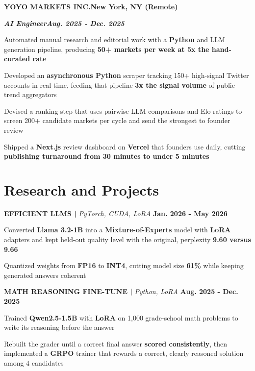 \documentclass[10pt]{article}
\newcommand{\job}[4]{%
  \vspace{0pt}%
  \textbf{\MakeUppercase{#1}}\hfill\textbf{#2}\par
  \vspace{0.5pt}%
  \textbf{\textit{#3}}\hfill\textbf{\textit{#4}}\par
}
\newcommand{\proj}[4]{%
  \vspace{3pt}%
  \textbf{\MakeUppercase{#1} | }\textit{#2}\hfill
  \textbf{#4}%
  \notblank{#3}{\ \textbf{| #3}}{}%
  \par
}
\begin{document}
\vspace{3pt}
\job{Yoyo Markets Inc.}{New York, NY (Remote)}{AI Engineer}{Aug. 2025 - Dec. 2025}
\begin{bullets}
  \item Automated manual research and editorial work with a \textbf{Python} and LLM generation pipeline, producing \textbf{50+ markets per week at 5x the hand-curated rate}
  \item Developed an \textbf{asynchronous Python} scraper tracking 150+ high-signal Twitter accounts in real time, feeding that pipeline \textbf{3x the signal volume} of public trend aggregators
  \item Devised a ranking step that uses pairwise LLM comparisons and Elo ratings to screen 200+ candidate markets per cycle and send the strongest to founder review
  \item Shipped a \textbf{Next.js} review dashboard on \textbf{Vercel} that founders use daily, cutting \textbf{publishing turnaround from 30 minutes to under 5 minutes}
\end{bullets}

\section{Research and Projects}
\vspace{-3pt}
\proj{Efficient LLMs}{PyTorch, CUDA, LoRA}{USC}{Jan. 2026 - May 2026}
\begin{bullets}
  \item Converted \textbf{Llama 3.2-1B} into a \textbf{Mixture-of-Experts} model with \textbf{LoRA} adapters and kept held-out quality level with the original, perplexity \textbf{9.60 versus 9.66}
  \item Quantized weights from \textbf{FP16} to \textbf{INT4}, cutting model size \textbf{61\%} while keeping generated answers coherent
\end{bullets}

\proj{Math Reasoning Fine-Tune}{Python, LoRA}{USC}{Aug. 2025 - Dec. 2025}
\begin{bullets}
  \item Trained \textbf{Qwen2.5-1.5B} with \textbf{LoRA} on 1,000 grade-school math problems to write its reasoning before the answer
  \item Rebuilt the grader until a correct final answer \textbf{scored consistently}, then implemented a \textbf{GRPO} trainer that rewards a correct, clearly reasoned solution among 4 candidates
\end{bullets}
\end{document}
